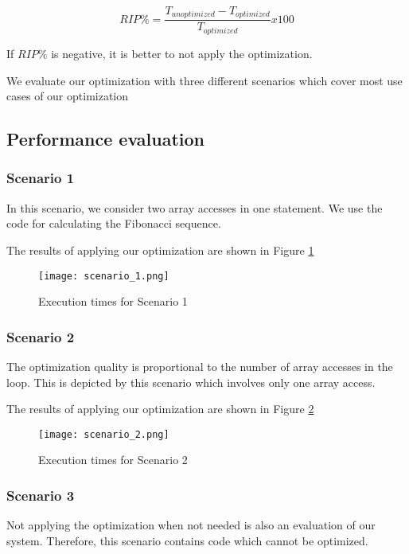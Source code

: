 \begin{equation*}
\label{rip}
RIP \% = \frac{T_{unoptimized}-T_{optimized}}{T_{optimized}} x 100%
\end{equation*}

If  $RIP\%$ is negative,  it is better to not apply the optimization.

We evaluate our optimization with three different scenarios which cover most use cases of our optimization

\subsection{Performance evaluation}

\subsubsection{Scenario 1}

In this scenario, we consider two array accesses in one statement. We use the code for calculating the Fibonacci sequence.

The results of applying our optimization are shown in Figure \ref{TC_1}

\begin{figure}[H]
	\texttt{[image: scenario\_1.png]}
	\caption{Execution times for Scenario 1}
	\label{TC_1}	
\end{figure}

\subsubsection{Scenario 2}

The optimization quality is proportional to the number of array accesses in the loop. This is depicted by this scenario which involves only one array access. 

The results of applying our optimization are shown in Figure \ref{TC_2}

\begin{figure}[H]
	\centering
	\texttt{[image: scenario\_2.png]}
	\caption{Execution times for Scenario 2}
	\label{TC_2}	
\end{figure}

\subsubsection{Scenario 3}

Not applying the optimization when not needed is also an evaluation of our system. Therefore, this scenario contains code which cannot be optimized.

